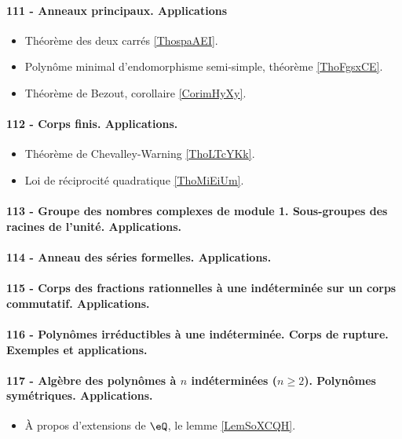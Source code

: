 \paragraph{111 - Anneaux principaux. Applications}
\begin{itemize}
    \item Théorème des deux carrés \ref{ThospaAEI}.
    \item Polynôme minimal d'endomorphisme semi-simple, théorème \ref{ThoFgsxCE}.
    \item Théorème de Bezout, corollaire \ref{CorimHyXy}.
\end{itemize}

\paragraph{112 - Corps finis. Applications.}
\begin{itemize}
    \item Théorème de Chevalley-Warning \ref{ThoLTcYKk}.
    \item Loi de réciprocité quadratique \ref{ThoMiEiUm}.
\end{itemize}


\paragraph{113 - Groupe des nombres complexes de module 1. Sous-groupes des racines de l’unité. Applications.}
\paragraph{114 - Anneau des séries formelles. Applications.}
\paragraph{115 - Corps des fractions rationnelles à une indéterminée sur un corps commutatif. Applications.}
\paragraph{116 - Polynômes irréductibles à une indéterminée. Corps de rupture. Exemples et applications.}
\paragraph{117 - Algèbre des polynômes à \( n\) indéterminées (\( n\geq 2\)). Polynômes symétriques. Applications.}
\begin{itemize}
    \item À propos d'extensions de \( \eQ\), le lemme \ref{LemSoXCQH}.
\end{itemize}
